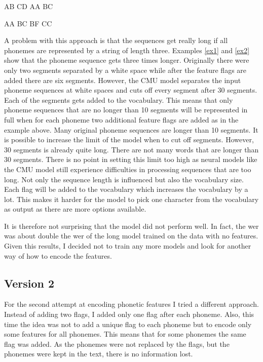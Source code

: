 \begin{covexamples}
\item \label{ex1}  AB CD  AA BC
\item \label{ex2}  AA BC   BF CC
\end{covexamples}

A problem with this approach is that the sequences get really long if all phonemes are represented by a string of length three.  Examples \ref{ex1} and \ref{ex2} show that the phoneme sequence gets three times longer. Originally there were only two segments separated by a white space while after the feature flags are added there are six segments. However, the CMU model separates the input phoneme sequences at white spaces and cuts off every segment after 30 segments. Each of the segments gets added to the vocabulary. This means that only phoneme sequences that are no longer than 10 segments will be represented in full when for each phoneme two additional feature flags are added as in the example above. Many original phoneme sequences are longer than 10 segments. It is possible to increase the limit of the model when to cut off segments. However, 30 segments is already quite long. There are not many words that are longer than 30 segments. There is no point in setting this limit too high as neural models like the CMU model still experience difficulties in processing sequences that are too long. Not only the sequence length is influenced but also the vocabulary size. Each flag will be added to the vocabulary which increases the vocabulary by a lot. This makes it harder for the model to pick one character from the vocabulary as output as there are more options available.  

It is therefore not surprising that the model did not perform well. In fact, the \ac{wer} was about double the \ac{wer} of the long model trained on the data with no features. Given this results, I decided not to train any more models and look for another way of how to encode the features.

\subsection*{Version 2}
For the second attempt at encoding phonetic features I tried a different approach. Instead of adding two flags, I added only one flag after each phoneme. Also, this time the idea was not to add a unique flag to each phoneme but to encode only some features for all phonemes. This means that for some phonemes the same flag was added. As the phonemes were not replaced by the flags, but the phonemes were kept in the text, there is no information lost. 

